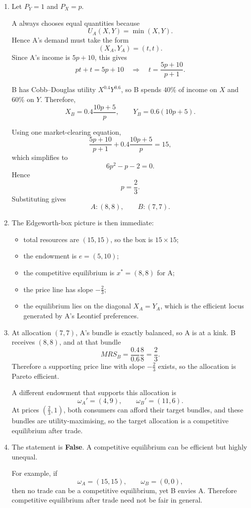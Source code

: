 \documentclass[12pt]{article}
\begin{document}
\begin{enumerate}[label=(\alph*)]
    \item
    Let \(P_Y=1\) and \(P_X=p\).

    A always chooses equal quantities because
    \[
    U_A(X,Y)=\min(X,Y).
    \]
    Hence A's demand must take the form
    \[
    (X_A,Y_A)=(t,t).
    \]
    Since A's income is \(5p+10\), this gives
    \[
    pt+t=5p+10
    \quad\Longrightarrow\quad
    t=\frac{5p+10}{p+1}.
    \]

    B has Cobb--Douglas utility \(X^{0.4}Y^{0.6}\), so B spends \(40\%\) of income on \(X\) and \(60\%\) on \(Y\). Therefore,
    \[
    X_B=0.4\frac{10p+5}{p},
    \qquad
    Y_B=0.6(10p+5).
    \]

    Using one market-clearing equation,
    \[
    \frac{5p+10}{p+1}+0.4\frac{10p+5}{p}=15,
    \]
    which simplifies to
    \[
    6p^2-p-2=0.
    \]
    Hence
    \[
    p=\frac23.
    \]
    Substituting gives
    \[
    A:(8,8),\qquad B:(7,7).
    \]

    \item
    The Edgeworth-box picture is then immediate:
    \begin{itemize}
        \item total resources are \((15,15)\), so the box is \(15\times 15\);
        \item the endowment is \(e=(5,10)\);
        \item the competitive equilibrium is \(x^*=(8,8)\) for A;
        \item the price line has slope \(-\frac23\);
        \item the equilibrium lies on the diagonal \(X_A=Y_A\), which is the efficient locus generated by A's Leontief preferences.
    \end{itemize}
\newpage
    \item
    At allocation \((7,7)\), A's bundle is exactly balanced, so A is at a kink. B receives \((8,8)\), and at that bundle
    \[
    MRS_B=\frac{0.4}{0.6}\frac{8}{8}=\frac23.
    \]
    Therefore a supporting price line with slope \(-\frac23\) exists, so the allocation is Pareto efficient.

    A different endowment that supports this allocation is
    \[
    \omega_A'=(4,9),
    \qquad
    \omega_B'=(11,6).
    \]
    At prices \(\left(\frac23,1\right)\), both consumers can afford their target bundles, and these bundles are utility-maximising, so the target allocation is a competitive equilibrium after trade.

    \item
    The statement is \textbf{False}. A competitive equilibrium can be efficient but highly unequal.

    For example, if
    \[
    \omega_A=(15,15),\qquad \omega_B=(0,0),
    \]
    then no trade can be a competitive equilibrium, yet B envies A. Therefore competitive equilibrium after trade need not be fair in general.
\end{enumerate}
\end{document}

